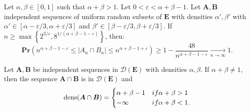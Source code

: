 \documentclass[10pt,a4paper]{amsart}
\def\Pr{\mathbf{Pr}}
\newcommand{\bs}{\boldsymbol}
\DeclareMathOperator{\dens}{dens}
\newcommand{\tendvers}{\xrightarrow[n\to\infty]{}}
\begin{document}
\begin{lem}\label{aux intersection} Let $\alpha,\beta\in [0,1]$ such that $\alpha + \beta > 1$. Let $0<\varepsilon<\alpha+\beta-1$. Let $\bs A, \bs B$ independent sequences of uniform random subsets of $\bs E$ with densities $\alpha',\beta'$ with $\alpha'\in [\alpha-\varepsilon/3,  \alpha+\varepsilon/3]$ and $\beta'\in [\beta-\varepsilon/3, \beta+\varepsilon/3]$. If $n\geq \max\left\{2^{3/\varepsilon},8^{1/(\alpha+\beta-1-\varepsilon)}\right\}$, then:
\[\Pr\left(n^{\alpha+\beta-1-\varepsilon}\leq |A_n\cap B_n|\leq n^{\alpha+\beta-1+\varepsilon}\right)\geq 1-\frac{48}{n^{\alpha+\beta-1-\varepsilon}}\tendvers 1.\]
\end{lem}

\begin{thm}\label{intersection} Let $\bs A, \bs B$ be independent sequences in $\mathcal{D}(\bs E)$ with densities $\alpha,\beta$. If $\alpha + \beta \neq 1$, then the sequence $\bs A\cap \bs B$ is in $\mathcal{D}(\bs E)$ and 
    \[\dens (\bs A\cap \bs B) = \begin{cases}
        \alpha + \beta - 1 & \textup{ if } \alpha + \beta > 1\\
        -\infty & \textup{ if } \alpha + \beta < 1.
        \end{cases}\]
\end{thm}
\end{document}
